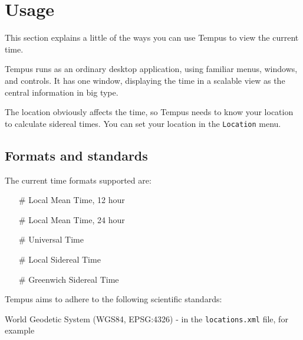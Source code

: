 \section{Usage}

This section explains a little of the ways you can use Tempus to view the current time.

Tempus runs as an ordinary desktop application, using familiar menus, windows, and controls. It has one window, displaying the time in a scalable view as the central information in big type.

The location obviously affects the time, so Tempus needs to know your location to calculate sidereal times. You can set your location in the \texttt{Location} menu.


\subsection{Formats and standards}

The current time formats supported are:
\begin{itemize}
    \item[\#] Local Mean Time, 12 hour
    \item[\#] Local Mean Time, 24 hour
    \item[\#] Universal Time
    \item[\#] Local Sidereal Time
    \item[\#] Greenwich Sidereal Time
\end{itemize}

Tempus aims to adhere to the following scientific standards:

World Geodetic System (WGS84, EPSG:4326) - in the \texttt{locations.xml} file, for example
